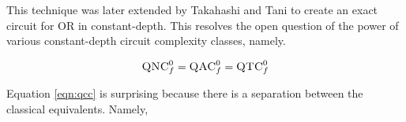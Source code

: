 This technique was later extended by Takahashi and Tani to create an exact circuit
for OR in constant-depth. This resolves the open question of the power of
various constant-depth circuit complexity classes, namely.

\begin{equation}
\label{eqn:qcc}
\textsc{QNC}_f^0 = \textsc{QAC}_f^0 = \textsc{QTC}_f^0
\end{equation}

Equation \ref{eqn:qcc} is surprising because there is a separation between
the classical equivalents. Namely, 

